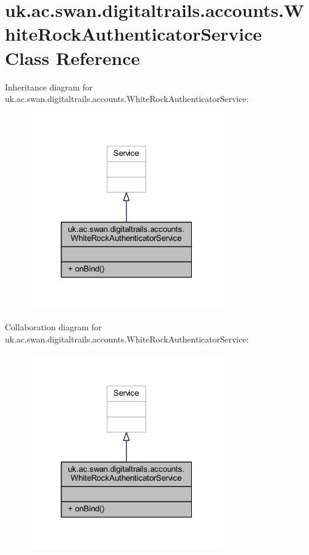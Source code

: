 \hypertarget{classuk_1_1ac_1_1swan_1_1digitaltrails_1_1accounts_1_1_white_rock_authenticator_service}{\section{uk.\+ac.\+swan.\+digitaltrails.\+accounts.\+White\+Rock\+Authenticator\+Service Class Reference}
\label{classuk_1_1ac_1_1swan_1_1digitaltrails_1_1accounts_1_1_white_rock_authenticator_service}
}


Inheritance diagram for uk.\+ac.\+swan.\+digitaltrails.\+accounts.\+White\+Rock\+Authenticator\+Service\+:
\nopagebreak
\begin{figure}[H]
\begin{center}
\leavevmode
\includegraphics[width=241pt]{classuk_1_1ac_1_1swan_1_1digitaltrails_1_1accounts_1_1_white_rock_authenticator_service__inherit__graph}
\end{center}
\end{figure}


Collaboration diagram for uk.\+ac.\+swan.\+digitaltrails.\+accounts.\+White\+Rock\+Authenticator\+Service\+:
\nopagebreak
\begin{figure}[H]
\begin{center}
\leavevmode
\includegraphics[width=241pt]{classuk_1_1ac_1_1swan_1_1digitaltrails_1_1accounts_1_1_white_rock_authenticator_service__coll__graph}
\end{center}
\end{figure}

